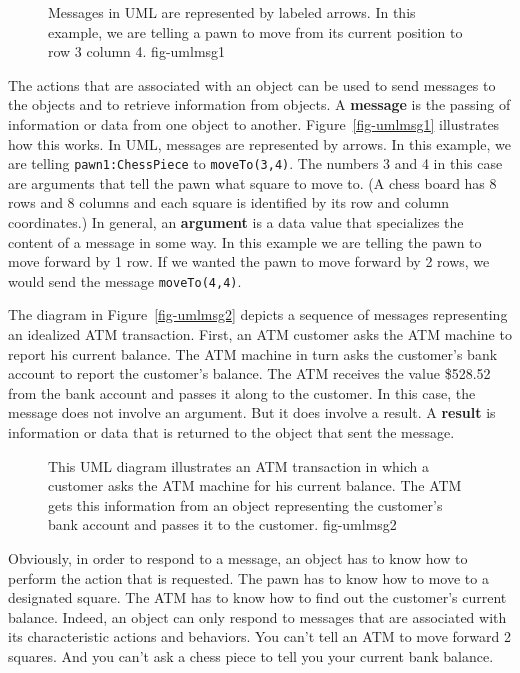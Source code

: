 \begin{figure}[tb]
 {Messages in UML are represented by labeled
arrows. In this example, we are telling a pawn to move from its
current position to row 3 column 4.  
} {fig-umlmsg1}

\end{figure}

The actions that are associated with an object can be used to send
messages to the objects and to retrieve information from objects.  A
{\bf message} is the passing of information or data from one object to
another.  Figure~\ref{fig-umlmsg1} illustrates how this works. In UML,
messages are represented by arrows. In this example, we are telling
{\tt pawn1:ChessPiece} to {\tt moveTo(3,4)}. The numbers 3 and 4 in
this case are arguments that tell the pawn what square to move to. (A
chess board has 8 rows and 8 columns and each square is identified by
its row and column coordinates.) In general, an {\bf argument} is a
data value that specializes the content of a message in some way. In
this example we are telling the pawn to move forward by 1 row. If we
wanted the pawn to move forward by 2 rows, we would send the message
{\tt moveTo(4,4)}.

The diagram in Figure~\ref{fig-umlmsg2} depicts a sequence of
messages representing an idealized ATM transaction. First, an ATM
customer asks the ATM machine to report his current balance. The ATM
machine in turn asks the customer's bank account to report the
customer's balance. The ATM receives the value \$528.52 from the bank
account and passes it along to the customer.  In this case, the
message does not involve an argument. But it does involve a result. A
{\bf result} is information or data that is returned to the object
that sent the message.

\begin{figure}[h]
 {This UML diagram illustrates an ATM
transaction in which a customer asks the ATM machine for his current
balance. The ATM gets this information from an object representing the
customer's bank account and passes it to the customer.}
{fig-umlmsg2}
\end{figure}

Obviously, in order to respond to a message, an object has to know how
to perform the action that is requested. The pawn has to know how to
move to a designated square. The ATM has to know how to find out the
customer's current balance. Indeed, an object can only respond to
messages that are associated with its characteristic actions and
behaviors.  You can't tell an ATM to move forward 2 squares. And you
can't ask a chess piece to tell you your current bank balance.

